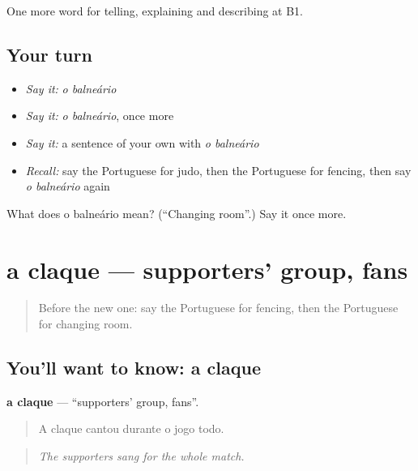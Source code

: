 \begin{grammarlens}[title={What you've built}]
One more word for telling, explaining and describing at B1.
\end{grammarlens}

\subsection*{Your turn}
\begin{itemize}
\raggedright
  \item \emph{Say it:} \emph{o balneário}
  \item \emph{Say it:} \emph{o balneário}, once more
  \item \emph{Say it:} a sentence of your own with \emph{o balneário}
  \item \emph{Recall:} say the Portuguese for judo, then the Portuguese for fencing, then say \emph{o balneário} again
\end{itemize}

\begin{tcolorbox}[breakable,colback=teal!4,colframe=teal!35!black,title={Before you move on}]
What does o balneário mean? (\textquotedblleft{}Changing room\textquotedblright{}.) Say it once more.
\end{tcolorbox}
\section[a claque]{a claque — supporters' group, fans}

\label{lesson:PT-C515-claque}



\begin{quote}
Before the new one: say the Portuguese for fencing, then the Portuguese for changing room.
\end{quote}

\subsection*{You'll want to know: a claque}
\textbf{a claque} — \textquotedblleft{}supporters' group, fans\textquotedblright{}.

\begin{quote}
A claque cantou durante o jogo todo.
\end{quote}

\begin{quote}
\emph{The supporters sang for the whole match.}
\end{quote}

